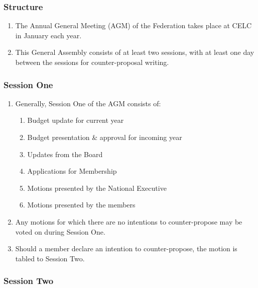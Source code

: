 \subsubsection{Structure}
\label{structure}

\begin{enumerate}
 \item
  The Annual General Meeting (AGM) of the Federation takes place at CELC in January each year.
 \item
  This General Assembly consists of at least two sessions, with at least one day between the sessions for counter-proposal writing.
\end{enumerate}

\subsubsection{Session One}
\label{session-one}

\begin{enumerate}
 \item
  Generally, Session One of the AGM consists of:

  \begin{enumerate}
   \item
    Budget update for current year
   \item
    Budget presentation \& approval for incoming year
   \item
    Updates from the Board
   \item
    Applications for Membership
   \item
    Motions presented by the National Executive
   \item
    Motions presented by the members
  \end{enumerate}

 \item
  Any motions for which there are no intentions to counter-propose may be voted on during Session One.
 \item
  Should a member declare an intention to counter-propose, the motion is tabled to Session Two.
\end{enumerate}

\subsubsection{Session Two}
\label{session-two}

